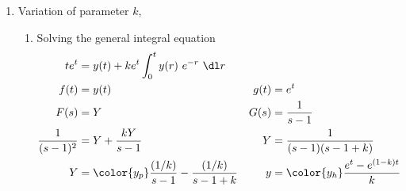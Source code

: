 \begin{enumerate}
    \item Variation of parameter $ k $,
          \begin{enumerate}
              \item Solving the general integral equation
                    \begin{align}
                        t e^t                     & = y(t) + ke^t\int_{0}^{t}
                        y(r)\ e^{-r}
                        \ \dl r                                                       \\
                        f(t)                      & = y(t)                          &
                        g(t)                      & = e^{t}                           \\
                        F(s)                      & = Y                             &
                        G(s)                      & = \frac{1}{s - 1}                 \\
                        \frac{1}{(s-1)^2}         & = Y + \frac{kY}{s - 1}          &
                        Y                         & = \frac{1}{(s-1)(s - 1 + k)}      \\
                        Y                         & = \color{y_p} \frac{(1/k)}{s-1}
                        - \frac{(1/k)}{s - 1 + k} &
                        y                         & = \color{y_h} \frac{e^{t}
                            - e^{(1-k)t}}{k}
                    \end{align}
                    \begin{figure}[H]
                        \centering
\end{figure}
\end{enumerate}
\end{enumerate}

